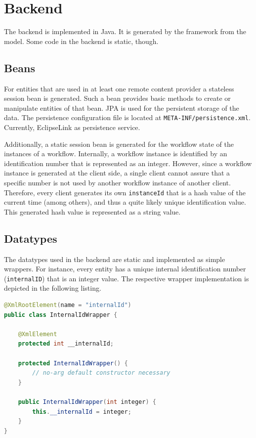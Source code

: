 \section{Backend}\label{sec:backend}

The \MD backend is implemented in Java. It is generated by the \MD framework from the \MD model. Some code in the backend is static, though. 

\subsection{Beans}
\label{subsec:beans}
For entities that are used in at least one remote content provider a stateless session bean is generated. Such a bean provides basic methods to create or manipulate entities of that bean. JPA is used for the persistent storage of the data. The persistence configuration file is located at \lstinline|META-INF/persistence.xml|. Currently, EclipseLink as persistence service.

Additionally, a static session bean is generated for the workflow state of the instances of a workflow. Internally, a workflow instance is identified by an identification number that is represented as an integer. However, since a workflow instance is generated at the client side, a single client cannot assure that a specific number is not used by another workflow instance of another client. Therefore, every client generates its own \lstinline|instanceId| that is a hash value of the current time (among others), and thus a quite likely unique identification value. This generated hash value is represented as a string value.

\subsection{Datatypes}
The datatypes used in the backend are static and implemented as simple wrappers. For instance, every entity has a unique internal identification number (\lstinline|internalID|) that is an integer value. The respective wrapper implementation is depicted in the following listing. 

\begin{lstlisting}[language=Java, label=lst:intIdWrapper, caption=An integer wrapper for the internal identification number]
@XmlRootElement(name = "internalId")
public class InternalIdWrapper {
	
	@XmlElement
	protected int __internalId;
	
	protected InternalIdWrapper() {
		// no-arg default constructor necessary
	}
	
	public InternalIdWrapper(int integer) {
		this.__internalId = integer;
	}
}
\end{lstlisting}

